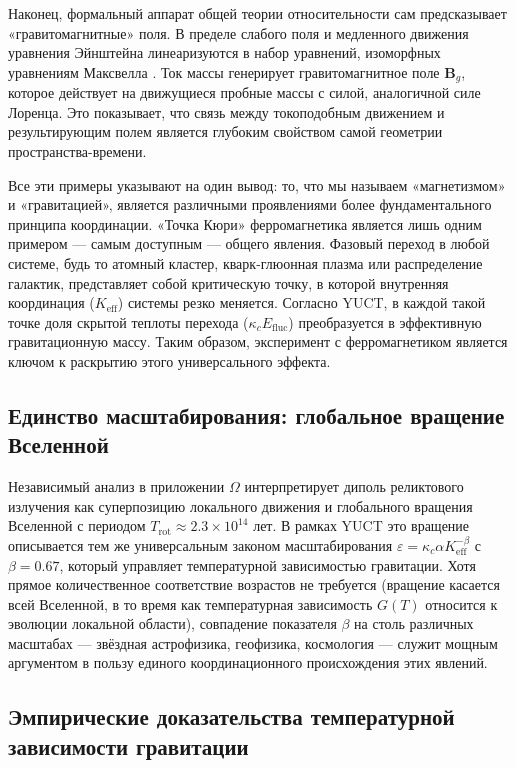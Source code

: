 \documentclass[12pt]{article}
\theoremstyle{remark}
\begin{document}
	Наконец, формальный аппарат общей теории относительности сам предсказывает «гравитомагнитные» поля. В пределе слабого поля и медленного движения уравнения Эйнштейна линеаризуются в набор уравнений, изоморфных уравнениям Максвелла \cite{ciufolini1995}. Ток массы генерирует гравитомагнитное поле $ \mathbf{B}_g$, которое действует на движущиеся пробные массы с силой, аналогичной силе Лоренца. Это показывает, что связь между токоподобным движением и результирующим полем является глубоким свойством самой геометрии пространства-времени.
	
	Все эти примеры указывают на один вывод: то, что мы называем «магнетизмом» и «гравитацией», является различными проявлениями более фундаментального принципа координации. «Точка Кюри» ферромагнетика является лишь одним примером — самым доступным — общего явления. Фазовый переход в любой системе, будь то атомный кластер, кварк-глюонная плазма или распределение галактик, представляет собой критическую точку, в которой внутренняя координация ($K_{\mathrm{eff}}$) системы резко меняется. Согласно YUCT, в каждой такой точке доля скрытой теплоты перехода ($\kappa_c E_{\mathrm{fluc}}$) преобразуется в эффективную гравитационную массу. Таким образом, эксперимент с ферромагнетиком является ключом к раскрытию этого универсального эффекта.
	
	\subsection{Единство масштабирования: глобальное вращение Вселенной}
	
	Независимый анализ в приложении $\Omega$ интерпретирует диполь реликтового излучения как суперпозицию локального движения и глобального вращения Вселенной с периодом $T_{\mathrm{rot}} \approx 2.3\times10^{14}$ лет. В рамках YUCT это вращение описывается тем же универсальным законом масштабирования $\varepsilon = \kappa_c \alpha K_{\mathrm{eff}}^{-\beta}$ с $\beta = 0.67$, который управляет температурной зависимостью гравитации. Хотя прямое количественное соответствие возрастов не требуется (вращение касается всей Вселенной, в то время как температурная зависимость $G(T)$ относится к эволюции локальной области), совпадение показателя $\beta$ на столь различных масштабах — звёздная астрофизика, геофизика, космология — служит мощным аргументом в пользу единого координационного происхождения этих явлений.
	
	\subsection{Эмпирические доказательства температурной зависимости гравитации}
	\label{sec:empirical}
	
\end{document}
